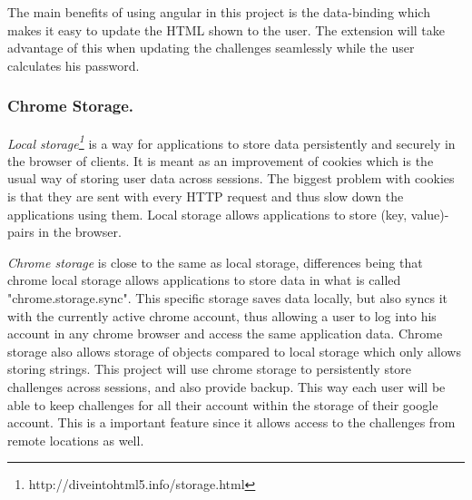 \par The main benefits of using angular in this project is the data-binding which makes it easy to update the HTML shown to the user. The extension will take advantage of this when updating the challenges seamlessly while the user calculates his password.

\subsubsection{Chrome Storage.}
\emph{Local storage\footnote{http://diveintohtml5.info/storage.html}} is a way for applications to store data persistently and securely in the browser of clients. It is meant as an improvement of cookies which is the usual way of storing user data across sessions. The biggest problem with cookies is that they are sent with every HTTP request and thus slow down the applications using them. Local storage allows applications to store (key, value)-pairs in the browser. 
\par \emph{Chrome storage} is close to the same as local storage, differences being that chrome local storage allows applications to store data in what is called "chrome.storage.sync". This specific storage saves data locally, but also syncs it with the currently active chrome account, thus allowing a user to log into his account in any chrome browser and access the same application data. Chrome storage also allows storage of objects compared to local storage which only allows storing strings. This project will use chrome storage to persistently store challenges across sessions, and also provide backup. This way each user will be able to keep challenges for all their account within the storage of their google account. This is a important feature since it allows access to the challenges from remote locations as well.

